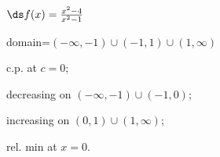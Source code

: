 {$\ds f(x) =\frac{x^2-4}{x^2-1}$
}
{domain=$(-\infty,-1)\cup(-1,1)\cup(1,\infty)$

c.p. at $c=0$; 

decreasing on $(-\infty,-1)\cup (-1,0)$;

increasing on $(0,1)\cup (1,\infty)$;

rel. min at $x=0$.
}
